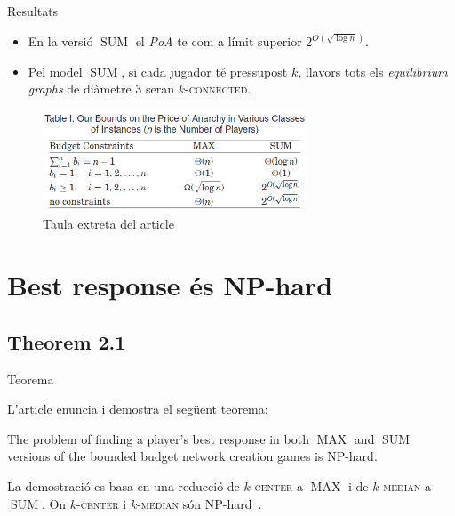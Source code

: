 \documentclass[aspectratio=169]{beamer}
\DeclareMathOperator{\SUM}{SUM}
\DeclareMathOperator{\MAX}{MAX}
\newcommand{\kcenter}{\texorpdfstring{$k$}{k}-\textsc{center}\xspace}
\newcommand{\kmedian}{\texorpdfstring{$k$}{k}-\textsc{median}\xspace}
\begin{document}
\begin{frame}{Resultats}
\begin{itemize}[<+->] 
    
    \item En la versió $\SUM$ el \emph{PoA} te com a límit superior $2^{O(\sqrt{\log n})}$.

    \vspace{1em}
    
    \item Pel model $\SUM$, si cada jugador té pressupost $k$, llavors tots els \emph{equilibrium graphs} de diàmetre $3$ seran $k$-\textsc{connected}.
    
\end{itemize} 

    \begin{figure}
    \centering
    \includegraphics[width=0.7\textwidth]{Table1_PoA_Bounds}
    \caption{Taula extreta del article \cite{ehsani_bounded_2015}}
    \end{figure}
\end{frame}

\section{Best response és NP-hard}
\subsection{Theorem 2.1}
\begin{frame}{Teorema}

    L'article enuncia i demostra el següent teorema:
    
    \begin{theorem}
    The problem of finding a player's best response in both $\MAX$ and $\SUM$ versions of the bounded
    budget network creation games is NP-hard.
    \end{theorem}
    
    \vspace{2em}
    
    La demostració es basa en una reducció de \kcenter a $\MAX$ i de \kmedian a $\SUM$.
    On \kcenter i \kmedian són 
    NP-hard~\cite{hsu_easy_1979,lin_e-approximations_1992,megiddo_complexity_1984}.
    
\end{frame}
\end{document}
